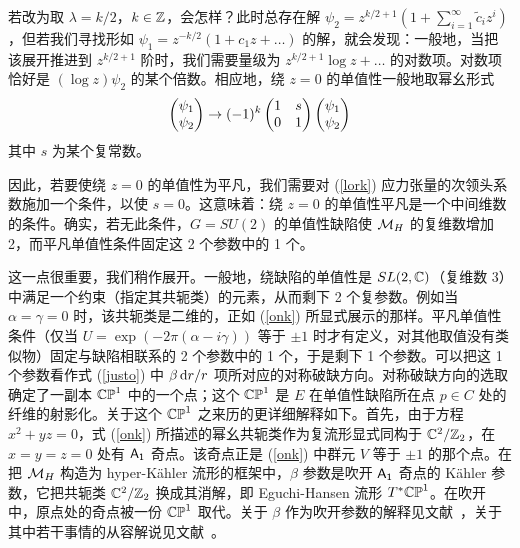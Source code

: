 
若改为取 $\lambda=k/2$，$k\in {\mathbb Z}$，会怎样？此时总存在解 $\psi_2=z^{k/2+1}(1+\sum_{i=1}^\infty \tilde c_iz^i)$，但若我们寻找形如 $\psi_1=z^{-k/2}(1+ c_1z+\dots)$ 的解，就会发现：一般地，当把该展开推进到 $z^{k/2+1}$ 阶时，我们需要量级为 $ z^{k/2+1}\log z+\dots$ 的对数项。对数项恰好是 $(\log z)\psi_2$ 的某个倍数。相应地，绕 $z=0$ 的单值性一般地取幂幺形式
\begin{equation}\label{omogg}
\begin{pmatrix} \psi_1\cr \psi_2\end{pmatrix}\to (-1)^k\begin{pmatrix} 1 &  s\cr
    0 & 1\end{pmatrix}\begin{pmatrix}\psi_1 \cr \psi_2\end{pmatrix}\end{equation}
    其中 $s$ 为某个复常数。

因此，若要使绕 $z=0$ 的单值性为平凡，我们需要对 (\ref{lork}) 应力张量的次领头系数施加一个条件，以使 $s=0$。这意味着：绕 $z=0$ 的单值性平凡是一个中间维数的条件。确实，若无此条件，$G=SU(2)$ 的单值性缺陷使 ${\mathcal M}_H$ 的复维数增加 2，而平凡单值性条件固定这 2 个参数中的 1 个。


这一点很重要，我们稍作展开。一般地，绕缺陷的单值性是 $SL(2,{\mathbb C})$（复维数 3）中满足一个约束（指定其共轭类）的元素，从而剩下 2 个复参数。例如当 $\alpha=\gamma=0$ 时，该共轭类是二维的，正如 (\ref{onk}) 所显式展示的那样。平凡单值性条件（仅当 $U=\exp(-2\pi(\alpha-i\gamma))$ 等于 $\pm 1$ 时才有定义，对其他取值没有类似物）固定与缺陷相联系的 2 个参数中的 1 个，于是剩下 1 个参数。可以把这 1 个参数看作式 (\ref{justo}) 中 $\beta \,{\mathrm d} r/r$ 项所对应的对称破缺方向。对称破缺方向的选取确定了一副本 ${\mathbb{CP}}^1$ 中的一个点；这个 ${\mathbb{CP}}^1$ 是 $E$ 在单值性缺陷所在点 $p\in C$ 处的纤维的射影化。关于这个 ${\mathbb{CP}}^1$ 之来历的更详细解释如下。首先，由于方程 $x^2+yz=0$，式 (\ref{onk}) 所描述的幂幺共轭类作为复流形显式同构于 ${\mathbb C}^2/{\mathbb Z}_2$，在 $x=y=z=0$ 处有 $\sf A_1$ 奇点。该奇点正是 (\ref{onk}) 中群元 $V$ 等于 $\pm 1$ 的那个点。在把 ${\mathcal M}_H$ 构造为 hyper-Kähler 流形的框架中，$\beta$ 参数是吹开 $\sf A_1$ 奇点的 Kähler 参数，它把共轭类 ${\mathbb C}^2/{\mathbb Z}_2$ 换成其消解，即 Eguchi-Hansen 流形 $T^*{\mathbb{CP}}^1$。在吹开中，原点处的奇点被一份 ${\mathbb{CP}}^1$ 取代。关于 $\beta$ 作为吹开参数的解释见文献~\cite{Simpson}，关于其中若干事情的从容解说见文献~\cite{GuW}。

